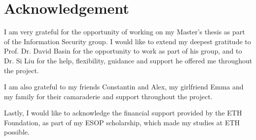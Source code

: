 \begin{abstract}
  
\end{abstract}

\newpage


\section*{Acknowledgement}
I am very grateful for the opportunity of working on my Master's thesis as part of the Information Security group. I would like to extend my deepest gratitude to Prof. Dr. David Basin for the opportunity to work as part of his group, and to Dr. Si Liu for the help, flexibility, guidance and support he offered me throughout the project.  

I am also grateful to my friends Constantin and Alex, my girlfriend Emma and my family for their camaraderie and support throughout the project.

Lastly, I would like to acknowledge the financial support provided by the ETH Foundation, as part of my ESOP scholarship, which made my studies at ETH possible.





